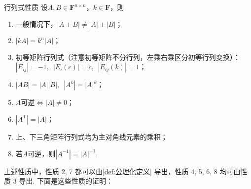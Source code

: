 \begin{example}{}{行列式性质}
    设$A,B \in \mathbf{F}^{n \times n}$，$k \in \mathbf{F}$，则
    \begin{enumerate}
        \item 一般情况下，$|A \pm B| \neq |A|\pm|B|$；

        \item $|kA|=k^n|A|$；

        \item \label{item:13:行列式性质:3}
            初等矩阵行列式（注意初等矩阵不分行列，左乘右乘区分初等行列变换）：\\
            $|E_{ij}|=-1,\enspace |E_i(c)|=c,\enspace |E_{ij}(k)|=1$；

        \item \label{item:13:行列式性质:4}
            $|AB|=|A||B|,\enspace|A^k|=|A|^k$；

        \item $A$可逆$\iff |A| \neq 0$；

        \item $|A^\mathrm{T}|=|A|$；

        \item \label{item:13:行列式性质:6}
            上、下三角矩阵行列式均为主对角线元素的乘积；

        \item 若$A$可逆，则$|A^{-1}|=|A|^{-1}$.

    \end{enumerate}
\end{example}

上述性质中，性质 2, 7 都可以由\autoref{def:公理化定义} 导出，性质 4, 5, 6, 8 均可由性质 3 导出. 下面是这些性质的证明：

